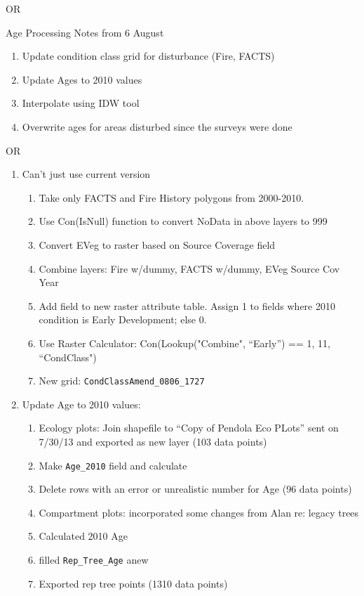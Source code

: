 OR 

Age Processing Notes from 6 August
\begin{enumerate}
\item Update condition class grid for disturbance (Fire, FACTS)
\item Update Ages to 2010 values
\item Interpolate using IDW tool
\item Overwrite ages for areas disturbed since the surveys were done
\end{enumerate}

OR

\begin{enumerate} 
\item Can't just use current version
    \begin{enumerate}
        \item Take only FACTS and Fire History polygons from 2000-2010.
        \item Use Con(IsNull) function to convert NoData in above layers to 999
        \item Convert EVeg to raster based on Source Coverage field
        \item Combine layers: Fire w/dummy, FACTS w/dummy, EVeg Source Cov Year
        \item Add field to new raster attribute table. Assign 1 to fields where 2010 condition is Early Development; else 0.
        \item Use Raster Calculator: Con(Lookup("Combine", ``Early'') == 1, 11, ``CondClass")
        \item New grid: \lstinline{CondClassAmend_0806_1727}
    \end{enumerate}
\item Update Age to 2010 values:
    \begin{enumerate}
        \item Ecology plots: Join shapefile to ``Copy of Pendola Eco PLots'' sent on 7/30/13 and exported as new layer (103 data points)
        \item Make \lstinline{Age_2010} field and calculate
        \item Delete rows with an error or unrealistic number for Age (96 data points)
        \item Compartment plots: incorporated some changes from Alan re: legacy trees
        \item Calculated 2010 Age
        \item filled \lstinline{Rep_Tree_Age} anew
        \item Exported rep tree points (1310 data points)

\end{enumerate}
\end{enumerate}
